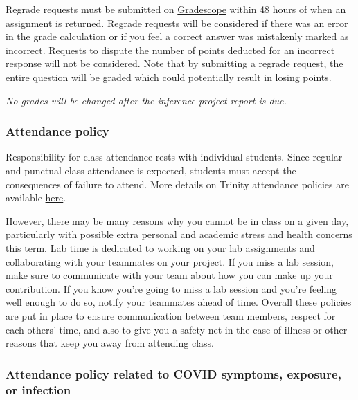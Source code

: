 \documentclass[
  letterpaper,
  DIV=11,
  numbers=noendperiod]{scrartcl}
\begin{document}
Regrade requests must be submitted on
\href{https://www.gradescope.com/courses/394638}{Gradescope} within 48
hours of when an assignment is returned. Regrade requests will be
considered if there was an error in the grade calculation or if you feel
a correct answer was mistakenly marked as incorrect. Requests to dispute
the number of points deducted for an incorrect response will not be
considered. Note that by submitting a regrade request, the entire
question will be graded which could potentially result in losing points.

\emph{No grades will be changed after the inference project report is
due.}

\hypertarget{attendance-policy}{%
\subsubsection{Attendance policy}\label{attendance-policy}}

Responsibility for class attendance rests with individual students.
Since regular and punctual class attendance is expected, students must
accept the consequences of failure to attend. More details on Trinity
attendance policies are available
\href{https://trinity.duke.edu/undergraduate/academic-policies/class-attendance-and-missed-work}{here}.

However, there may be many reasons why you cannot be in class on a given
day, particularly with possible extra personal and academic stress and
health concerns this term. Lab time is dedicated to working on your lab
assignments and collaborating with your teammates on your project. If
you miss a lab session, make sure to communicate with your team about
how you can make up your contribution. If you know you're going to miss
a lab session and you're feeling well enough to do so, notify your
teammates ahead of time. Overall these policies are put in place to
ensure communication between team members, respect for each others'
time, and also to give you a safety net in the case of illness or other
reasons that keep you away from attending class.

\hypertarget{attendance-policy-related-to-covid-symptoms-exposure-or-infection}{%
\subsubsection{Attendance policy related to COVID symptoms, exposure, or
infection}\label{attendance-policy-related-to-covid-symptoms-exposure-or-infection}}
\end{document}
